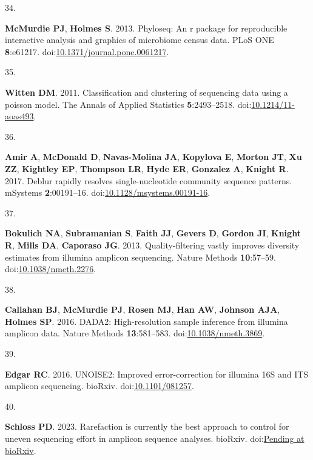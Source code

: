 \documentclass[
]{article}
\newlength{\cslhangindent}
\newlength{\csllabelwidth}
\newlength{\cslentryspacingunit} %
\newenvironment{CSLReferences}[2] %
 {%
  \setlength{\parindent}{0pt}
  \ifodd #1
  \let\oldpar\par
  \def\par{\hangindent=\cslhangindent\oldpar}
  \fi
  \setlength{\parskip}{#2\cslentryspacingunit}
 }%
 {}
\newcommand{\CSLLeftMargin}[1]{\parbox[t]{\csllabelwidth}{#1}}
\newcommand{\CSLRightInline}[1]{\parbox[t]{\linewidth - \csllabelwidth}{#1}\break}
\begin{document}
\begin{CSLReferences}{0}{1}
\leavevmode{}%
\CSLLeftMargin{34. }%
\CSLRightInline{\textbf{McMurdie PJ}, \textbf{Holmes S}. 2013. Phyloseq:
An r package for reproducible interactive analysis and graphics of
microbiome census data. {PLoS} {ONE} \textbf{8}:e61217.
doi:\href{https://doi.org/10.1371/journal.pone.0061217}{10.1371/journal.pone.0061217}.}

\leavevmode{}%
\CSLLeftMargin{35. }%
\CSLRightInline{\textbf{Witten DM}. 2011. Classification and clustering
of sequencing data using a poisson model. The Annals of Applied
Statistics \textbf{5}:2493--2518.
doi:\href{https://doi.org/10.1214/11-aoas493}{10.1214/11-aoas493}.}

\leavevmode{}%
\CSLLeftMargin{36. }%
\CSLRightInline{\textbf{Amir A}, \textbf{McDonald D},
\textbf{Navas-Molina JA}, \textbf{Kopylova E}, \textbf{Morton JT},
\textbf{Xu ZZ}, \textbf{Kightley EP}, \textbf{Thompson LR}, \textbf{Hyde
ER}, \textbf{Gonzalez A}, \textbf{Knight R}. 2017. Deblur rapidly
resolves single-nucleotide community sequence patterns. {mSystems}
\textbf{2}:00191--16.
doi:\href{https://doi.org/10.1128/msystems.00191-16}{10.1128/msystems.00191-16}.}

\leavevmode{}%
\CSLLeftMargin{37. }%
\CSLRightInline{\textbf{Bokulich NA}, \textbf{Subramanian S},
\textbf{Faith JJ}, \textbf{Gevers D}, \textbf{Gordon JI}, \textbf{Knight
R}, \textbf{Mills DA}, \textbf{Caporaso JG}. 2013. Quality-filtering
vastly improves diversity estimates from illumina amplicon sequencing.
Nature Methods \textbf{10}:57--59.
doi:\href{https://doi.org/10.1038/nmeth.2276}{10.1038/nmeth.2276}.}

\leavevmode{}%
\CSLLeftMargin{38. }%
\CSLRightInline{\textbf{Callahan BJ}, \textbf{McMurdie PJ},
\textbf{Rosen MJ}, \textbf{Han AW}, \textbf{Johnson AJA}, \textbf{Holmes
SP}. 2016. {DADA}2: High-resolution sample inference from illumina
amplicon data. Nature Methods \textbf{13}:581--583.
doi:\href{https://doi.org/10.1038/nmeth.3869}{10.1038/nmeth.3869}.}

\leavevmode{}%
\CSLLeftMargin{39. }%
\CSLRightInline{\textbf{Edgar RC}. 2016. {UNOISE}2: Improved
error-correction for illumina 16S and {ITS} amplicon sequencing.
bio{R}xiv. doi:\href{https://doi.org/10.1101/081257}{10.1101/081257}.}

\leavevmode{}%
\CSLLeftMargin{40. }%
\CSLRightInline{\textbf{Schloss PD}. 2023. Rarefaction is currently the
best approach to control for uneven sequencing effort in amplicon
sequence analyses. bio{R}xiv.
doi:\href{https://doi.org/Pending\%20at\%20bioRxiv}{Pending at
bioRxiv}.}


\end{CSLReferences}
\end{document}
